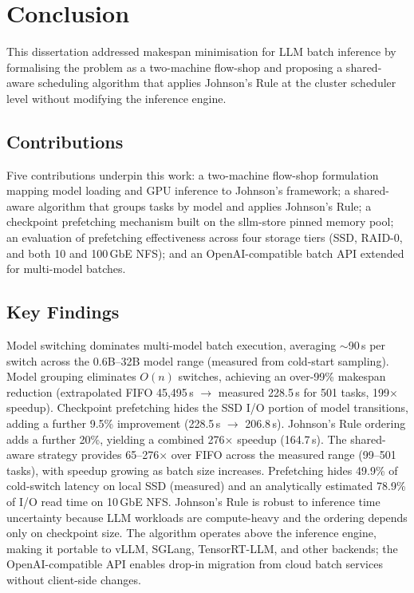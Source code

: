 \documentclass[logo,bsc,singlespacing,parskip,online]{infthesis}
\begin{document}

\chapter{Conclusion}

This dissertation addressed makespan minimisation for LLM batch inference by formalising the problem as a two-machine flow-shop and proposing a shared-aware scheduling algorithm that applies Johnson's Rule at the cluster scheduler level without modifying the inference engine.

\section{Contributions}

Five contributions underpin this work: a two-machine flow-shop formulation mapping model loading and GPU inference to Johnson's framework; a shared-aware algorithm that groups tasks by model and applies Johnson's Rule; a checkpoint prefetching mechanism built on the sllm-store pinned memory pool; an evaluation of prefetching effectiveness across four storage tiers (SSD, RAID-0, and both 10 and 100\,GbE NFS); and an OpenAI-compatible batch API extended for multi-model batches.

\section{Key Findings}

Model switching dominates multi-model batch execution, averaging $\sim$90\,s per switch across the 0.6B--32B model range (measured from cold-start sampling). Model grouping eliminates $O(n)$ switches, achieving an over-99\% makespan reduction (extrapolated FIFO 45{,}495\,s $\to$ measured 228.5\,s for 501 tasks, 199$\times$ speedup). Checkpoint prefetching hides the SSD I/O portion of model transitions, adding a further 9.5\% improvement (228.5\,s $\to$ 206.8\,s). Johnson's Rule ordering adds a further 20\%, yielding a combined 276$\times$ speedup (164.7\,s). The shared-aware strategy provides 65--276$\times$ over FIFO across the measured range (99--501 tasks), with speedup growing as batch size increases. Prefetching hides 49.9\% of cold-switch latency on local SSD (measured) and an analytically estimated 78.9\% of I/O read time on 10\,GbE NFS. Johnson's Rule is robust to inference time uncertainty because LLM workloads are compute-heavy and the ordering depends only on checkpoint size. The algorithm operates above the inference engine, making it portable to vLLM, SGLang, TensorRT-LLM, and other backends; the OpenAI-compatible API enables drop-in migration from cloud batch services without client-side changes.





\end{document}
